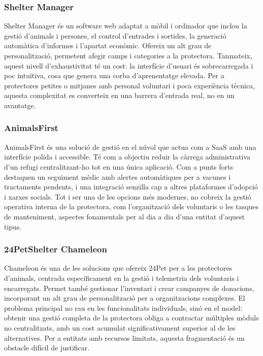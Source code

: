 \documentclass[11pt,a4paper]{report}
\begin{document}
\subsubsection[Shelter Manager]{Shelter Manager \cite{sheltermanagercom_shelter_nodate}}
Shelter Manager és un software web adaptat a mòbil i ordinador que inclou la gestió d'animals i persones, el control d'entrades i sortides, la generació automàtica d'informes i l'apartat econòmic. Ofereix un alt grau de personalització, permetent afegir camps i categories a la protectora. Tanmateix, aquest nivell d'exhaustivitat té un cost: la interfície d'usuari és sobrecarregada i poc intuïtiva, cosa que genera una corba d'aprenentatge elevada. Per a protectores petites o mitjanes amb personal voluntari i poca experiència tècnica, aquesta complexitat es converteix en una barrera d'entrada real, no en un avantatge.

\subsubsection[AnimalsFirst]{AnimalsFirst \cite{animalsfirst_track_nodate}}
AnimalsFirst és una solució de gestió en el núvol que actua com a SaaS amb una interfície polida i accessible. Té com a objectiu reduir la càrrega administrativa d'un refugi centralitzant-ho tot en una única aplicació. Com a punts forts destaquen un seguiment mèdic amb alertes automàtiques per a vacunes i tractaments pendents, i una integració senzilla cap a altres plataformes d'adopció i xarxes socials. Tot i ser una de les opcions més modernes, no cobreix la gestió operativa interna de la protectora, com l'organització dels voluntaris o les tasques de manteniment, aspectes fonamentals per al dia a dia d'una entitat d'aquest tipus.

\subsubsection[24PetShelter Chameleon]{24PetShelter Chameleon \cite{24pet_bringing_nodate}}
Chameleon és una de les solucions que ofereix 24Pet per a les protectores d'animals, centrada específicament en la gestió i telemetria dels voluntaris i encarregats. Permet també gestionar l'inventari i crear campanyes de donacions, incorporant un alt grau de personalització per a organitzacions complexes. El problema principal no rau en les funcionalitats individuals, sinó en el model: obtenir una gestió completa de la protectora obliga a contractar múltiples mòduls no centralitzats, amb un cost acumulat significativament superior al de les alternatives. Per a entitats amb recursos limitats, aquesta fragmentació és un obstacle difícil de justificar.
\end{document}
